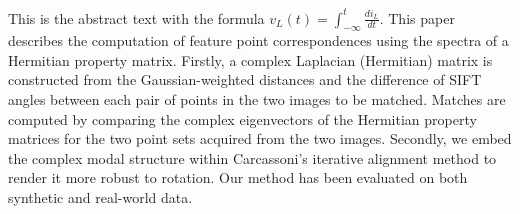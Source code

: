 This is the abstract text with the formula $v_L(t)=\int^t_{-\infty}
\frac{di_L}{dt}$. This paper describes the computation of feature
point correspondences using the spectra of a Hermitian property
matrix. Firstly, a complex Laplacian (Hermitian) matrix is
constructed from the Gaussian-weighted distances and the difference
of SIFT angles between each pair of points in the two images to be
matched. Matches are computed by comparing the complex eigenvectors
of the Hermitian property matrices for the two point sets acquired
from the two images. Secondly, we embed the complex modal structure
within Carcassoni's iterative alignment method to render it more
robust to rotation. Our method has been evaluated on both synthetic
and real-world data.
